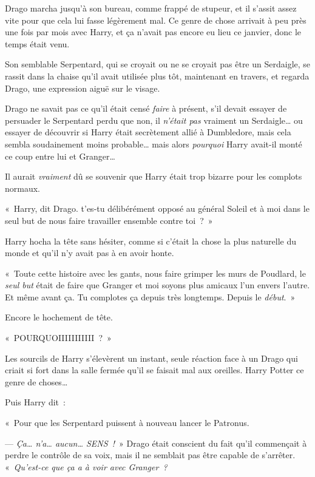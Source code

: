Drago marcha jusqu'à son bureau, comme frappé de stupeur, et il s'assit assez vite pour que cela lui fasse légèrement mal. Ce genre de chose arrivait à peu près une fois par mois avec Harry, et ça n'avait pas encore eu lieu ce janvier, donc le temps était venu.

Son semblable Serpentard, qui se croyait ou ne se croyait pas être un Serdaigle, se rassit dans la chaise qu'il avait utilisée plus tôt, maintenant en travers, et regarda Drago, une expression aiguë sur le visage.

Drago ne savait pas ce qu'il était censé \emph{faire} à présent, s'il devait essayer de persuader le Serpentard perdu que non, il \emph{n'était pas} vraiment un Serdaigle… ou essayer de découvrir si Harry était secrètement allié à Dumbledore, mais cela sembla soudainement moins probable… mais alors \emph{pourquoi} Harry avait-il monté ce coup entre lui et Granger…

Il aurait \emph{vraiment} dû se souvenir que Harry était trop bizarre pour les complots normaux.

«~Harry, dit Drago. t'es-tu délibérément opposé au général Soleil et à moi dans le seul but de nous faire travailler ensemble contre toi~?~»

Harry hocha la tête sans hésiter, comme si c'était la chose la plus naturelle du monde et qu'il n'y avait pas à en avoir honte.

«~Toute cette histoire avec les gants, nous faire grimper les murs de Poudlard, le \emph{seul but} était de faire que Granger et moi soyons plus amicaux l'un envers l'autre. Et même avant ça. Tu complotes ça depuis très longtemps. Depuis le \emph{début}.~»

Encore le hochement de tête.

«~POURQUOIIIIIIIIIII~?~»

Les sourcils de Harry s'élevèrent un instant, seule réaction face à un Drago qui criait si fort dans la salle fermée qu'il se faisait mal aux oreilles.  Harry Potter  ce genre de choses…

Puis Harry dit~:

«~Pour que les Serpentard puissent à nouveau lancer le Patronus.

--- \emph{Ça… n'a… aucun… SENS~!}~» Drago était conscient du fait qu'il commençait à perdre le contrôle de sa voix, mais il ne semblait pas être capable de s'arrêter. «~\emph{Qu'est-ce que ça a à voir avec Granger~?}

